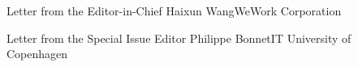 \documentclass[11pt]{article}
\begin{document}


\begin{bulletin}


%
%

\begin{lettersection}


\begin{letter}{Letter from the Editor-in-Chief}
{Haixun Wang}{WeWork Corporation}
%
\end{letter}
%
\newpage
%
%
\begin{letter}{Letter from the Special Issue Editor}
{Philippe Bonnet}{IT University of Copenhagen}
%

\end{letter}

\end{lettersection}



\end{bulletin}
\end{document}
